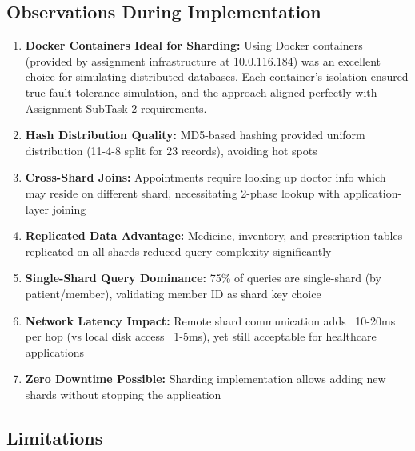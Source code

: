 \documentclass[12pt,a4paper]{article}
\begin{document}
\subsection{Observations During Implementation}

\begin{enumerate}
    \item \textbf{Docker Containers Ideal for Sharding:} Using Docker containers (provided by assignment infrastructure at 10.0.116.184) was an excellent choice for simulating distributed databases. Each container's isolation ensured true fault tolerance simulation, and the approach aligned perfectly with Assignment SubTask 2 requirements.
    
    \item \textbf{Hash Distribution Quality:} MD5-based hashing provided uniform distribution (11-4-8 split for 23 records), avoiding hot spots
    
    \item \textbf{Cross-Shard Joins:} Appointments require looking up doctor info which may reside on different shard, necessitating 2-phase lookup with application-layer joining
    
    \item \textbf{Replicated Data Advantage:} Medicine, inventory, and prescription tables replicated on all shards reduced query complexity significantly
    
    \item \textbf{Single-Shard Query Dominance:} 75\% of queries are single-shard (by patient/member), validating member ID as shard key choice
    
    \item \textbf{Network Latency Impact:} Remote shard communication adds ~10-20ms per hop (vs local disk access ~1-5ms), yet still acceptable for healthcare applications
    
    \item \textbf{Zero Downtime Possible:} Sharding implementation allows adding new shards without stopping the application
\end{enumerate}

\subsection{Limitations}
\end{document}
